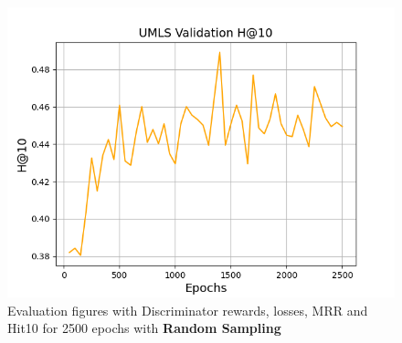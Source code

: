 \begin{figure}
\begin{minipage}{.5\textwidth}
    \end{minipage}%
    \begin{minipage}{.5\textwidth}
      \centering
      \includegraphics[width=0.9\linewidth]{appendices/umls/random/gan_train_umls_hit10.png}
    \end{minipage}
    \caption{Evaluation figures with Discriminator rewards, losses, \ac{MRR} and Hit\@10 for 2500 epochs with \textbf{Random Sampling}}
    \label{fig:test}
\end{figure}

